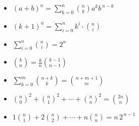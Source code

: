 \vspace{-4.5mm}
\begin{itemize}
\item $(a+b)^n = \sum_{k=0}^{n} \binom{n}{k} a^k b^{\,n-k}$ 
\item $(k+1)^n = \sum_{i=0}^{n} k^i \cdot \binom{n}{i}$ 
\item $\displaystyle \sum_{i=0}^{n} \binom{n}{i} = 2^n$ 
\item $\binom{k}{n} = \frac{k}{n} \binom{k-1}{n-1}$ 
\item $\displaystyle \sum_{k=0}^{m} \binom{n+k}{k} = \binom{n+m+1}{m}$ 
\item $\binom{n}{0}^2 + \binom{n}{1}^2 + \cdots + \binom{n}{n}^2 = \binom{2n}{n}$
\item $1\binom{n}{1} + 2\binom{n}{2} + \cdots + n\binom{n}{n} = n \, 2^{\,n-1}$ 
\end{itemize}